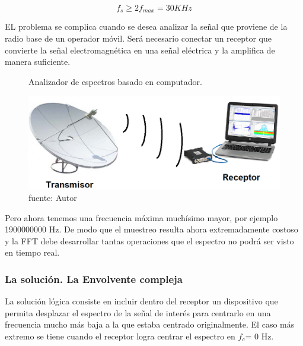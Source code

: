 \begin{equation} \label{capdos_catorce}
f_{s} \geq 2f_{max} = 30KHz
\end{equation}

EL problema se complica cuando se desea analizar la señal que proviene de la radio base de un operador móvil. Será necesario conectar un receptor que convierte la señal electromagnética en una señal eléctrica y la amplifica de manera suficiente. \\ 

\begin{figure}[h!]
	\captionsetup{justification = raggedright,singlelinecheck = false}	
    \caption{Analizador de espectros basado en computador.} 
    \label{fig:Analizador}
    \centering
    \includegraphics[trim = 0mm 0mm 0mm 0mm, clip,width=1\textwidth]{Imagenes/Analizador}
	\par
		\caption*{fuente: Autor}
\end{figure}

Pero ahora tenemos una frecuencia máxima muchísimo mayor, por ejemplo 1900000000 Hz. De modo que el muestreo resulta ahora extremadamente costoso y la FFT debe desarrollar tantas operaciones que el espectro no podrá ser visto en tiempo real. \\ 

\subsubsection{La solución. La Envolvente compleja}

{\setlength{\parindent}{1pt}La solución lógica consiste en incluir dentro  del receptor un dispositivo que permita desplazar el espectro de la señal de interés para centrarlo en una frecuencia mucho más baja a la que estaba centrado originalmente. El caso más extremo se tiene cuando el receptor logra centrar el espectro en $f_{c}$= 0 Hz.}  \\ 

